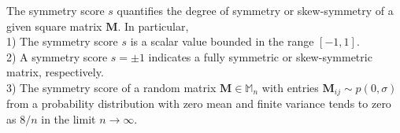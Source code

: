 \begin{proposition}
\label{prop-symmetry-score}
%
The symmetry score $s$ quantifies the degree of symmetry or skew-symmetry of a given square matrix $\bm{M}$. In particular, \\
%
1) The symmetry score $s$ is a scalar value bounded in the range $[-1, 1]$. \\
%
2) A symmetry score $s = \pm 1$ indicates a fully symmetric or skew-symmetric matrix, respectively. 
\\
3) The symmetry score of a random matrix $\bm{M} \in \mathbb{M}_n$ with entries $\bm{M}_{ij} \sim p(0,\sigma)$ from a probability distribution with zero mean and finite variance tends to zero as $8/n$ in the limit $n\rightarrow\infty$.
%
\end{proposition}